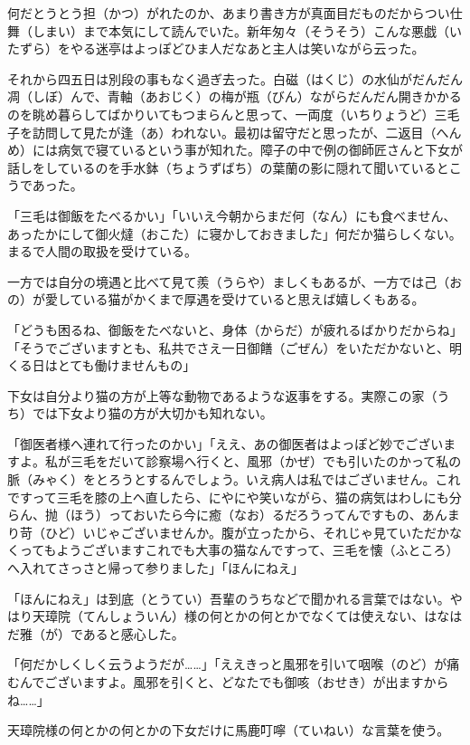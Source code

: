 \documentclass{book}
\begin{document}
何だとうとう担（かつ）がれたのか、あまり書き方が真面目だものだからつい仕舞（しまい）まで本気にして読んでいた。新年匆々（そうそう）こんな悪戯（いたずら）をやる迷亭はよっぽどひま人だなあと主人は笑いながら云った。

それから四五日は別段の事もなく過ぎ去った。白磁（はくじ）の水仙がだんだん凋（しぼ）んで、青軸（あおじく）の梅が瓶（びん）ながらだんだん開きかかるのを眺め暮らしてばかりいてもつまらんと思って、一両度（いちりょうど）三毛子を訪問して見たが逢（あ）われない。最初は留守だと思ったが、二返目（へんめ）には病気で寝ているという事が知れた。障子の中で例の御師匠さんと下女が話しをしているのを手水鉢（ちょうずばち）の葉蘭の影に隠れて聞いているとこうであった。

「三毛は御飯をたべるかい」「いいえ今朝からまだ何（なん）にも食べません、あったかにして御火燵（おこた）に寝かしておきました」何だか猫らしくない。まるで人間の取扱を受けている。

一方では自分の境遇と比べて見て羨（うらや）ましくもあるが、一方では己（おの）が愛している猫がかくまで厚遇を受けていると思えば嬉しくもある。

「どうも困るね、御飯をたべないと、身体（からだ）が疲れるばかりだからね」「そうでございますとも、私共でさえ一日御饍（ごぜん）をいただかないと、明くる日はとても働けませんもの」

下女は自分より猫の方が上等な動物であるような返事をする。実際この家（うち）では下女より猫の方が大切かも知れない。

「御医者様へ連れて行ったのかい」「ええ、あの御医者はよっぽど妙でございますよ。私が三毛をだいて診察場へ行くと、風邪（かぜ）でも引いたのかって私の脈（みゃく）をとろうとするんでしょう。いえ病人は私ではございません。これですって三毛を膝の上へ直したら、にやにや笑いながら、猫の病気はわしにも分らん、抛（ほう）っておいたら今に癒（なお）るだろうってんですもの、あんまり苛（ひど）いじゃございませんか。腹が立ったから、それじゃ見ていただかなくってもようございますこれでも大事の猫なんですって、三毛を懐（ふところ）へ入れてさっさと帰って参りました」「ほんにねえ」

「ほんにねえ」は到底（とうてい）吾輩のうちなどで聞かれる言葉ではない。やはり天璋院（てんしょういん）様の何とかの何とかでなくては使えない、はなはだ雅（が）であると感心した。

「何だかしくしく云うようだが\ldots{}\ldots{}」「ええきっと風邪を引いて咽喉（のど）が痛むんでございますよ。風邪を引くと、どなたでも御咳（おせき）が出ますからね\ldots{}\ldots{}」

天璋院様の何とかの何とかの下女だけに馬鹿叮嚀（ていねい）な言葉を使う。
\end{document}
